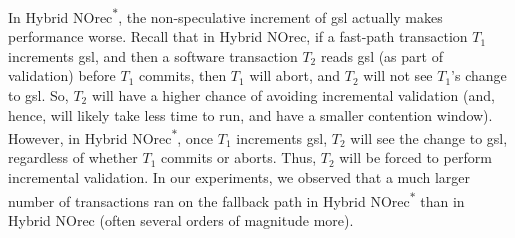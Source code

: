 In Hybrid NOrec\textsuperscript{$\ast$}, the non-speculative increment of gsl actually makes performance worse. Recall that in Hybrid NOrec, 
if a fast-path transaction $T_1$ increments gsl, and then a software transaction $T_2$ reads gsl (as part of validation) before $T_1$ commits, then $T_1$ will abort, 
and $T_2$ will not see $T_1$'s change to gsl. 
So, $T_2$ will have a higher chance of avoiding incremental validation (and, hence, will likely take less time to run, and have a smaller contention window).
However, in Hybrid NOrec\textsuperscript{$\ast$}, once $T_1$ increments gsl, $T_2$ will see the change to gsl, regardless of whether $T_1$ commits or aborts. Thus, 
$T_2$ will be forced to perform incremental validation. In our experiments, we observed that a much larger number of transactions ran on 
the fallback path in Hybrid NOrec\textsuperscript{$\ast$} than in Hybrid NOrec (often several orders of magnitude more).


